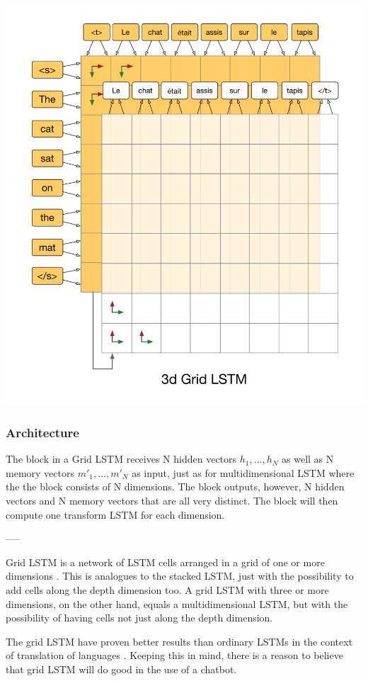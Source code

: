 \documentclass{article} %
\begin{document}
\newline
\includegraphics[scale=0.5]{3dgridlstm} \newline


\subsubsection{Architecture}
The block in a Grid LSTM receives N hidden vectors $h_1, ..., h_N$ as well as N memory vectors $m'_1, ..., m'_N$ as input, just as for multidimensional LSTM where the the block consists of N dimensions. The block outputs, however, N hidden vectors and N memory vectors that are all very distinct. The block will then compute one transform LSTM for each dimension.

-----


Grid LSTM is a network of LSTM cells arranged in a grid of one or more dimensions \cite{gridLSTM}. This is analogues to the stacked LSTM, just with the possibility to add cells along the depth dimension too. A grid LSTM with three or more dimensions, on the other hand, equals a multidimensional LSTM, but with the possibility of having cells not just along the depth dimension.

The grid LSTM have proven better results than ordinary LSTMs in the context of translation of languages \cite{gridLSTM}. Keeping this in mind, there is a reason to believe that grid LSTM will do good in the use of a chatbot.
\end{document}
